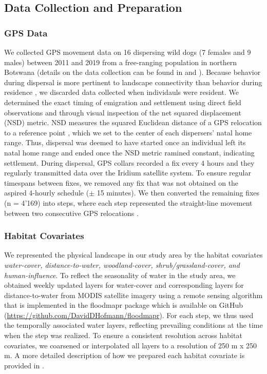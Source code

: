 \documentclass[abstract=on,10pt,a4paper,bibliography=totocnumbered]{article}
\begin{document}
\subsection{Data Collection and Preparation}
\subsubsection{GPS Data}
We collected GPS movement data on 16 dispersing wild dogs (7 females and 9
males) between 2011 and 2019 from a free-ranging population in northern Botswana
(details on the data collection can be found in \cite{Cozzi.2020} and
\cite{Hofmann.2021}). Because behavior during dispersal is more pertinent to
landscape connectivity than behavior during residence \citep{Elliot.2014,
Abrahms.2017}, we discarded data collected when individauls were resident. We
determined the exact timing of emigration and settlement using direct field
observations and through visual inspection of the net squared displacement (NSD)
metric. NSD measures the squared Euclidean distance of a GPS relocation to a
reference point \citep{Borger.2012}, which we set to the center of each
dispersers' natal home range. Thus, dispersal was deemed to have started once an
individual left its natal home range and ended once the NSD metric ramined
constant, indicating settlement. During dispersal, GPS collars recorded a fix
every 4 hours and they regularly transmitted data over the Iridium satellite
system. To ensure regular timespans between fixes, we removed any fix that was
not obtained on the aspired 4-hourly schedule (\( \pm \) 15 minutes). We then
converted the remaining fixes (n = 4'169) into steps, where each step
represented the straight-line movement between two consecutive GPS relocations
\citep{Turchin.1998}.

\subsubsection{Habitat Covariates}
We represented the physical landscape in our study area by the habitat
covariates \textit{water-cover, distance-to-water, woodland-cover,
shrub/grassland-cover, and human-influence}. To reflect the seasonality of water
in the study area, we obtained weekly updated layers for water-cover and
corresponding layers for distance-to-water from MODIS satellite imagery using a
remote sensing algorithm \citealp{Wolski.2017, Hofmann.2021} that is implemented
in the \textsf{floodmapr} package which is available on GitHub
(\url{https://github.com/DavidDHofmann/floodmapr}). For each step, we thus used
the temporally associated water layers, reflecting prevailing conditions at the
time when the step was realized. To ensure a consistent resolution across
habitat covariates, we coarsened or interpolated all layers to a resolution of
250 m x 250 m. A more detailed description of how we prepared each habitat
covariate is provided in \cite{Hofmann.2021}.
\end{document}
